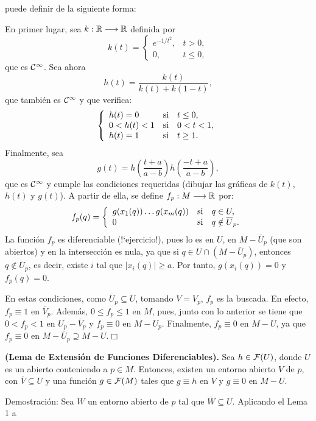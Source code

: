 \documentclass[cursovd_portada.tex]{subfiles}
\begin{document}
puede definir de la siguiente forma:
\par
En primer lugar, sea $k:\mathbb{R}\longrightarrow \mathbb{R}$ definida por
$$k(t)=\left\{
\begin{array}{lc}
e^{-1/t^2}, & t>0,\\
0, & t\leq 0,
\end{array}
\right.$$ que es ${\cal C}^{\infty}$. Sea ahora
$$h(t)=\frac{k(t)}{k(t)+k(1-t)},$$
que tambi\'{e}n es ${\cal C}^{\infty}$ y que verifica:
$$\left\{
\begin{array}{lll}
h(t)=0 & {\rm si} & t\leq 0,\\
0<h(t)<1 & {\rm si} & 0<t<1,\\
h(t)=1 & {\rm si} & t\geq 1.
\end{array}
\right.$$
Finalmente, sea
$$g(t)=h(\frac{t+a}{a-b})h(\frac{-t+a}{a-b}),$$
que es ${\cal C}^{\infty}$ y cumple las condiciones requeridas (dibujar las gr\'{a}ficas de $k(t)$, $h(t)$ y $g(t)$).
A partir de ella, se define $f_p:M\longrightarrow\mathbb{R}$ por:
$$f_p(q)=\left\{
\begin{array}{lll}
g(x_1(q))\dots g(x_m(q)) & {\rm si} & q\in U,\\
0 & {\rm si} & q\notin \overline{U}_p.
\end{array}
\right.$$ \hs La funci\'{o}n $f_p$ es diferenciable (!`ejercicio!), pues lo es en $U$, en $M-\overline{U}_p$ (que son
abiertos) y en la intersecci\'{o}n es nula, ya que si $q\in U\cap (M-\overline{U}_p)$, entonces
$q\notin\overline{U}_p$, es decir, existe $i$ tal que $\vert x_i(q)\vert\geq a$. Por tanto, $g(x_i(q))=0$ y
$f_p(q)=0$.
\par
En estas condiciones, como $\overline{U}_p\subseteq U$, tomando $V=V_p$, $f_p$ es la buscada. En efecto,
$f_p\equiv 1$ en $\overline{V}_p$. Adem\'{a}s, $0\leq f_p\leq 1$ en $M$, pues, junto con lo anterior se tiene que
$0<f_p<1$ en $U_p-\overline{V}_p$ y $f_p\equiv 0$ en $M-U_p$. Finalmente, $f_p\equiv 0$ en $M-U$, ya que
$f_p\equiv 0$ en $M-\overline{U}_p\supseteq M-U$.\hfill $\Box$
\begin{teoap}
{\bf (Lema de Extensi\'{o}n de Funciones Diferenciables).} Sea $h\in{\cal F}(U)$, donde $U$ es un abierto conteniendo
a $p\in M$. Entonces, existen un entorno abierto $V$ de $p$, con $\overline{V}\subseteq U$ y una funci\'{o}n
$g\in{\cal F}(M)$ tales que $g\equiv h$ en $V$ y $g\equiv 0$ en $M-U$.
\end{teoap}
{\sc Demostraci\'{o}n:} Sea $W$ un entorno abierto de $p$ tal que $\overline{W} \subseteq U$. Aplicando el Lema 1 a
\end{document}
